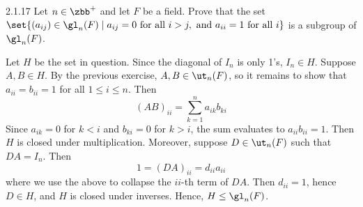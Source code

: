\begin{exercise}{2.1.17}
    Let $n \in \zbb^+$ and let $F$ be a field.
	Prove that the set $\set{ (a_{ij}) \in \gl_n(F) \mid a_{ij} = 0 \text{ for all } i > j,\ \text{and } a_{ii} = 1 \text{ for all } i }$ is a subgroup of $\gl_n(F)$.
\end{exercise}

\begin{sol}
    Let $H$ be the set in question.
	Since the diagonal of $I_n$ is only 1's, $I_n \in H$.
	Suppose $A, B \in H$.
	By the previous exercise, $A, B \in \ut_n(F)$, so it remains to show that $a_{ii} = b_{ii} = 1$ for all $1 \leq i \leq n$.
	Then
    \[
    	(AB)_{ii} = \sum_{k = 1}^n a_{ik}b_{ki}
    \]
    Since $a_{ik} = 0$ for $k < i$ and $b_{ki} = 0$ for $k > i$, the sum evaluates to $a_{ii}b_{ii} = 1$.
	Then $H$ is closed under multiplication.
	Moreover, suppose $D \in \ut_n(F)$ such that $DA = I_n$.
	Then
    \[
    	1 = (DA)_{ii} = d_{ii}a_{ii}
    \]
    where we use the above to collapse the $ii$-th term of $DA$.
	Then $d_{ii} = 1$, hence $D \in H$, and $H$ is closed under inverses.
	Hence, $H \leq \gl_n(F)$.
\end{sol}